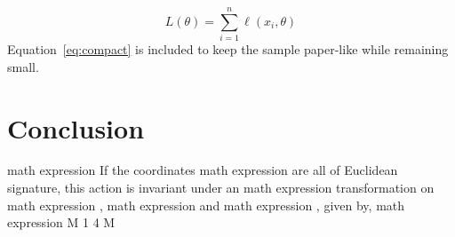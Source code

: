 \documentclass[11pt]{article}
\begin{document}
\begin{equation}
\label{eq:compact}
L(\theta) = \sum_{i=1}^{n} \ell(x_i, \theta)
\end{equation}
Equation~\ref{eq:compact} is included to keep the sample paper-like while remaining small.

\section{Conclusion}

math expression If the coordinates math expression are all of Euclidean signature, this action is invariant under an math expression transformation on math expression , math expression and math expression , given by, math expression M 1 4 M
\end{document}
